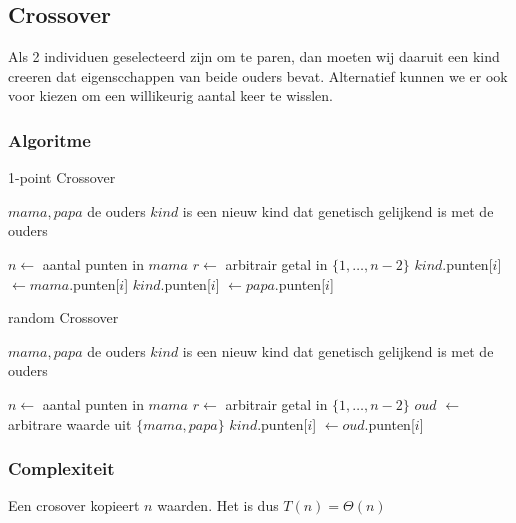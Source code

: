 %
\subsection{Crossover}
\label{sub:crossover}
Als 2 individuen geselecteerd zijn om te paren, dan moeten wij daaruit een kind creeren dat eigenscchappen van beide ouders bevat. 
Alternatief kunnen we er ook voor kiezen om een willikeurig aantal keer te wisslen.
\subsubsection{Algoritme}
	\begin{algorithm}[H]
	 	\caption{1-point Crossover}
		\begin{algorithmic}
		\Require $mama, papa$ de ouders
		\Ensure $kind$ is een nieuw kind dat genetisch gelijkend is met de ouders
		
		\State $n \gets $ aantal punten in $mama$
		\State $r \gets$ arbitrair getal in $\lbrace 1, \dots , n-2\rbrace$
			\State $kind$.punten[$i$] $\gets mama$.punten[$i$]
		\EndFor
			\State $kind$.punten[$i$] $\gets papa$.punten[$i$]
		\EndFor
		\end{algorithmic}
		\label{alg:crossover-1point}
	\end{algorithm}		

	\begin{algorithm}[H]
	 	\caption{random Crossover}
		\begin{algorithmic}
		\Require $mama, papa$ de ouders
		\Ensure $kind$ is een nieuw kind dat genetisch gelijkend is met de ouders
		
		\State $n \gets $ aantal punten in $mama$
		\State $r \gets$ arbitrair getal in $\lbrace 1, \dots , n-2\rbrace$
		\For{i \textbf{from} 0 \textbf{to} $n-1$}
		\State $oud$ $\gets$ arbitrare waarde uit $\lbrace mama, papa \rbrace$
		\State $kind$.punten[$i$] $\gets oud$.punten[$i$]
			
		\EndFor

		\end{algorithmic}
		\label{alg:crossover-random}
	\end{algorithm}		



\subsubsection{Complexiteit}
Een crosover kopieert $n$ waarden. Het is dus $T(n)=\Theta(n)$



